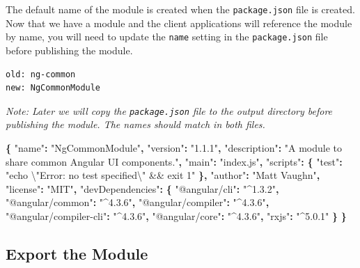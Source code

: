 \documentclass[]{book}
\newenvironment{Shaded}{\begin{snugshade}}{\end{snugshade}}
\newcommand{\SpecialCharTok}[1]{\textcolor[rgb]{0.00,0.00,0.00}{#1}}
\newcommand{\StringTok}[1]{\textcolor[rgb]{0.31,0.60,0.02}{#1}}
\newcommand{\OperatorTok}[1]{\textcolor[rgb]{0.81,0.36,0.00}{\textbf{#1}}}
\theoremstyle{definition}
\theoremstyle{definition}
\theoremstyle{definition}
\theoremstyle{remark}
\begin{document}
The default name of the module is created when the \texttt{package.json}
file is created. Now that we have a module and the client applications
will reference the module by name, you will need to update the
\texttt{name} setting in the \texttt{package.json} file before
publishing the module.

\begin{verbatim}
old: ng-common
new: NgCommonModule
\end{verbatim}

\emph{Note: Later we will copy the \texttt{package.json} file to the
output directory before publishing the module. The names should match in
both files. }

\begin{Shaded}
\begin{Highlighting}[]
\OperatorTok{\{}
  \StringTok{"name"}\OperatorTok{:} \StringTok{"NgCommonModule"}\OperatorTok{,}
  \StringTok{"version"}\OperatorTok{:} \StringTok{"1.1.1"}\OperatorTok{,}
  \StringTok{"description"}\OperatorTok{:} \StringTok{"A module to share common Angular UI components."}\OperatorTok{,}
  \StringTok{"main"}\OperatorTok{:} \StringTok{"index.js"}\OperatorTok{,}
  \StringTok{"scripts"}\OperatorTok{:} \OperatorTok{\{}
    \StringTok{"test"}\OperatorTok{:} \StringTok{"echo }\SpecialCharTok{\textbackslash{}"}\StringTok{Error: no test specified}\SpecialCharTok{\textbackslash{}"}\StringTok{ && exit 1"}
  \OperatorTok{\},}
  \StringTok{"author"}\OperatorTok{:} \StringTok{"Matt Vaughn"}\OperatorTok{,}
  \StringTok{"license"}\OperatorTok{:} \StringTok{"MIT"}\OperatorTok{,}
  \StringTok{"devDependencies"}\OperatorTok{:} \OperatorTok{\{}
    \StringTok{"@angular/cli"}\OperatorTok{:} \StringTok{"^1.3.2"}\OperatorTok{,}
    \StringTok{"@angular/common"}\OperatorTok{:} \StringTok{"^4.3.6"}\OperatorTok{,}
    \StringTok{"@angular/compiler"}\OperatorTok{:} \StringTok{"^4.3.6"}\OperatorTok{,}
    \StringTok{"@angular/compiler-cli"}\OperatorTok{:} \StringTok{"^4.3.6"}\OperatorTok{,}
    \StringTok{"@angular/core"}\OperatorTok{:} \StringTok{"^4.3.6"}\OperatorTok{,}
    \StringTok{"rxjs"}\OperatorTok{:} \StringTok{"^5.0.1"}
  \OperatorTok{\}}
\OperatorTok{\}}
\end{Highlighting}
\end{Shaded}

\subsection{Export the Module}\label{export-the-module}
\end{document}
